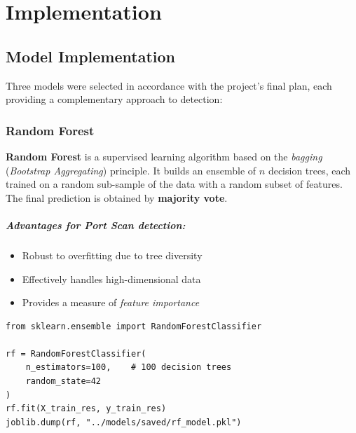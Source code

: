 
\chapter{Implementation}

\section{Model Implementation}

Three models were selected in accordance with the project's final plan, each providing a complementary approach to detection:

\subsection{Random Forest}

\textbf{Random Forest} is a supervised learning algorithm based on the \textit{bagging} (\textit{Bootstrap Aggregating}) principle. It builds an ensemble of $n$ decision trees, each trained on a random sub-sample of the data with a random subset of features. The final prediction is obtained by \textbf{majority vote}.

\paragraph{Advantages for Port Scan detection:}
\begin{itemize}
    \item Robust to overfitting due to tree diversity
    \item Effectively handles high-dimensional data
    \item Provides a measure of \textit{feature importance}
\end{itemize}

\begin{lstlisting}[caption={Random Forest Training}]
from sklearn.ensemble import RandomForestClassifier

rf = RandomForestClassifier(
    n_estimators=100,    # 100 decision trees
    random_state=42
)
rf.fit(X_train_res, y_train_res)
joblib.dump(rf, "../models/saved/rf_model.pkl")
\end{lstlisting}

